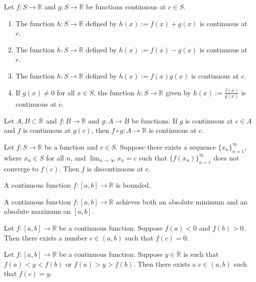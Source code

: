 \documentclass[../main.tex]{subfiles}
\begin{document}
    \begin{proposition}
        Let $f : S \to \mathbb{R}$ and $g : S \to \mathbb{R}$ be functions continuous at $c \in S$.
    \begin{enumerate}
        \item The function $h: S \to \mathbb{R}$ defined by $h(x) := f(x) + g(x)$ is continuous at $c$.
        \item The function $h: S \to \mathbb{R}$ defined by $h(x) := f(x) - g(x)$ is continuous at $c$.
        \item The function $h: S \to \mathbb{R}$ defined by $h(x) := f(x)g(x)$ is continuous at $c$.
        \item If $g(x) \neq 0$ for all $x \in S$, the function $h: S \to \mathbb{R}$ given by $h(x) := \frac{f(x)}{g(x)}$ is continuous at $c$.
    \end{enumerate}
    \end{proposition}
        
    \begin{proposition}
        Let $A, B \subset \mathbb{R}$ and $f : B \to \mathbb{R}$ and $g : A \to B$ be functions. If $g$ is continuous at $c \in A$ and $f$ is continuous at $g(c)$, then $f \circ g: A \to \mathbb{R}$ is continuous at $c$.
    \end{proposition}
        
    \begin{proposition}
        Let $f : S \to \mathbb{R}$ be a function and $c \in S$. Suppose there exists a sequence $\{x_n\}_{n=1}^{\infty}$, where $x_n \in S$ for all $n$, and $\lim_{n\to\infty} x_n = c$ such that $\{f(x_n)\}_{n=1}^{\infty}$ does not converge to $f(c)$. Then $f$ is discontinuous at $c$.
    \end{proposition}
        
    \begin{lemma}
        A continuous function $f : [a,b] \to \mathbb{R}$ is bounded.
    \end{lemma}
        
    \begin{theorem}
        A continuous function $f : [a,b] \to \mathbb{R}$ achieves both an absolute minimum and an absolute maximum on $[a,b]$.
    \end{theorem}
        
    \begin{lemma}
        Let $f : [a,b] \to \mathbb{R}$ be a continuous function. Suppose $f(a) < 0$ and $f(b) > 0$. Then there exists a number $c \in (a,b)$ such that $f(c) = 0$.
    \end{lemma}
        
    \begin{theorem}
        Let $f : [a,b] \to \mathbb{R}$ be a continuous function. Suppose $y \in \mathbb{R}$ is such that $f(a) < y < f(b)$ or $f(a) > y > f(b)$. Then there exists a $c \in (a,b)$ such that $f(c) = y$.
    \end{theorem}
        
    
\end{document}
